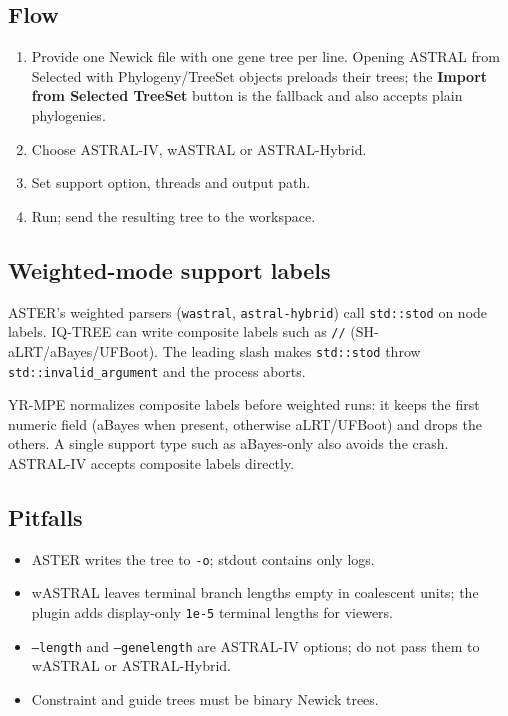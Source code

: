 \documentclass[11pt]{report}
\begin{document}
\subsection{Flow}

\begin{enumerate}
  \item Provide one Newick file with one gene tree per line. Opening ASTRAL from Selected with Phylogeny/TreeSet objects preloads their trees; the \textbf{Import from Selected TreeSet} button is the fallback and also accepts plain phylogenies.
  \item Choose ASTRAL-IV, wASTRAL or ASTRAL-Hybrid.
  \item Set support option, threads and output path.
  \item Run; send the resulting tree to the workspace.
\end{enumerate}

\subsection{Weighted-mode support labels}

ASTER's weighted parsers (\texttt{wastral}, \texttt{astral-hybrid}) call \texttt{std::stod} on node labels. IQ-TREE can write composite labels such as \texttt{//} (SH-aLRT/aBayes/UFBoot). The leading slash makes \texttt{std::stod} throw \texttt{std::invalid\_\allowbreak argument} and the process aborts.

YR-MPE normalizes composite labels before weighted runs: it keeps the first numeric field (aBayes when present, otherwise aLRT/UFBoot) and drops the others. A single support type such as aBayes-only also avoids the crash. ASTRAL-IV accepts composite labels directly.

\subsection{Pitfalls}

\begin{itemize}
  \item ASTER writes the tree to \texttt{-o}; stdout contains only logs.
  \item wASTRAL leaves terminal branch lengths empty in coalescent units; the plugin adds display-only \texttt{1e-5} terminal lengths for viewers.
  \item \texttt{--length} and \texttt{--genelength} are ASTRAL-IV options; do not pass them to wASTRAL or ASTRAL-Hybrid.
  \item Constraint and guide trees must be binary Newick trees.
\end{itemize}
\end{document}
